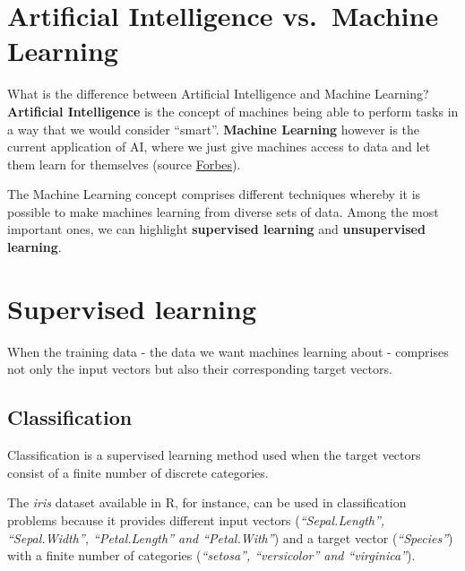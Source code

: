 \documentclass[]{book}
\begin{document}
\section{Artificial Intelligence vs.~Machine
Learning}\label{artificial-intelligence-vs.machine-learning}

What is the difference between Artificial Intelligence and Machine
Learning? \textbf{Artificial Intelligence} is the concept of machines
being able to perform tasks in a way that we would consider ``smart''.
\textbf{Machine Learning} however is the current application of AI,
where we just give machines access to data and let them learn for
themselves (source
\href{https://www.forbes.com/sites/bernardmarr/2016/12/06/what-is-the-difference-between-artificial-intelligence-and-machine-learning/}{Forbes}).

The Machine Learning concept comprises different techniques whereby it
is possible to make machines learning from diverse sets of data. Among
the most important ones, we can highlight \textbf{supervised learning}
and \textbf{unsupervised learning}.

\section{Supervised learning}\label{supervised-learning}

When the training data - the data we want machines learning about -
comprises not only the input vectors but also their corresponding target
vectors.

\subsection{Classification}\label{classification}

Classification is a supervised learning method used when the target
vectors consist of a finite number of discrete categories.

The \emph{iris} dataset available in R, for instance, can be used in
classification problems because it provides different input vectors
(\emph{``Sepal.Length'', ``Sepal.Width'', ``Petal.Length'' and
``Petal.With''}) and a target vector (\emph{``Species''}) with a finite
number of categories (\emph{``setosa'', ``versicolor'' and
``virginica''}).
\end{document}
